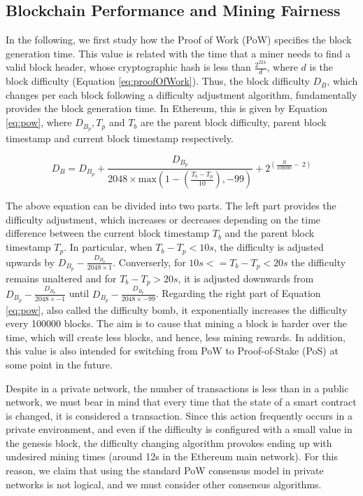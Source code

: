 \subsection{Blockchain Performance and Mining Fairness}

In the following, we first study how the Proof of Work (PoW) specifies the block generation time. This value is related with the time that a miner needs to find a valid block header, whose cryptographic hash is less than $\frac{2^{224}}{d}$, where $d$ is the block difficulty (Equation \ref{eq:proofOfWork}). Thus, the block difficulty $D_B$, which changes per each block following a difficulty adjustment algorithm, fundamentally provides the block generation time. In Ethereum, this is given by Equation \ref{eq:pow}, where $D_{B_p}, T_p$ and $T_b$ are the parent block difficulty, parent block timestamp and current block timestamp respectively.

\begin{equation} \label{eq:pow}
 D_B = D_{B_p} + \frac{D_{B_p}}{2048 \times \text{max}(1-(\frac{T_b - T_p}{10}), -99)} + 2^{(\frac{B}{100000} - \ 2)} 
  \end{equation}

The above equation can be divided into two parts. The left part provides the difficulty adjustment, which increases or decreases depending on the time difference between the current block timestamp $T_b$ and the parent block timestamp $T_p$. In particular, when $T_b - T_p < 10s$, the difficulty is adjusted upwards by $D_{B_p} - \frac{D_{B_p}}{2048 \times 1}$. Converserly, for $10s <= T_b - T_p < 20s$ the difficulty remains unaltered and for $T_b - T_p > 20s$, it is adjusted downwards from $D_{B_p} - \frac{D_{B_p}}{2048 \times -1}$ until $D_{B_p} - \frac{D_{B_p}}{2048 \times -99}$. Regarding the right part of Equation \ref{eq:pow}, also called the difficulty bomb, it exponentially increases the difficulty every 100000 blocks. The aim is to cause that mining a block is harder over the time, which will create less blocks, and hence, less mining rewards. In addition, this value is also intended for switching from PoW to Proof-of-Stake (PoS) at some point in the future.

Despite in a private network, the number of transactions is less than in a public network, we must bear in mind that every time that the state of a smart contract is changed, it is considered a transaction. Since this action frequently occurs in a private environment, and even if the difficulty is configured with a small value in the genesis block, the difficulty changing algorithm provokes ending up with undesired mining times (around 12s in the Ethereum main network). For this reason, we claim that using the standard PoW consensus model in private networks is not logical, and we must consider other consensus algorithms.

